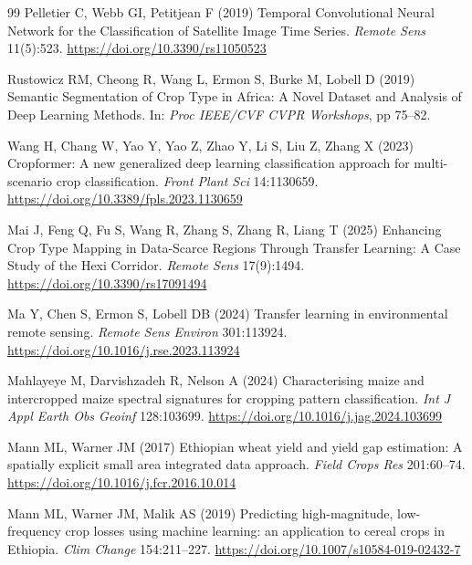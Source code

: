\documentclass[pdflatex,sn-mathphys]{sn-jnl} %
\begin{document}
\begin{thebibliography}{99}
Pelletier C, Webb GI, Petitjean F (2019) Temporal Convolutional Neural Network for the Classification of Satellite Image Time Series. \textit{Remote Sens} 11(5):523. \href{https://doi.org/10.3390/rs11050523}{https://doi.org/10.3390/rs11050523}

Rustowicz RM, Cheong R, Wang L, Ermon S, Burke M, Lobell D (2019) Semantic Segmentation of Crop Type in Africa: A Novel Dataset and Analysis of Deep Learning Methods. In: \textit{Proc IEEE/CVF CVPR Workshops}, pp 75--82.


Wang H, Chang W, Yao Y, Yao Z, Zhao Y, Li S, Liu Z, Zhang X (2023) Cropformer: A new generalized deep learning classification approach for multi-scenario crop classification. \textit{Front Plant Sci} 14:1130659. \href{https://doi.org/10.3389/fpls.2023.1130659}{https://doi.org/10.3389/fpls.2023.1130659}


Mai J, Feng Q, Fu S, Wang R, Zhang S, Zhang R, Liang T (2025) Enhancing Crop Type Mapping in Data-Scarce Regions Through Transfer Learning: A Case Study of the Hexi Corridor. \textit{Remote Sens} 17(9):1494. \href{https://doi.org/10.3390/rs17091494}{https://doi.org/10.3390/rs17091494}


Ma Y, Chen S, Ermon S, Lobell DB (2024) Transfer learning in environmental remote sensing. \textit{Remote Sens Environ} 301:113924. \href{https://doi.org/10.1016/j.rse.2023.113924}{https://doi.org/10.1016/j.rse.2023.113924}


Mahlayeye M, Darvishzadeh R, Nelson A (2024) Characterising maize and intercropped maize spectral signatures for cropping pattern classification. \textit{Int J Appl Earth Obs Geoinf} 128:103699. \href{https://doi.org/10.1016/j.jag.2024.103699}{https://doi.org/10.1016/j.jag.2024.103699}


Mann ML, Warner JM (2017) Ethiopian wheat yield and yield gap estimation: A spatially explicit small area integrated data approach. \textit{Field Crops Res} 201:60--74. \href{https://doi.org/10.1016/j.fcr.2016.10.014}{https://doi.org/10.1016/j.fcr.2016.10.014}

Mann ML, Warner JM, Malik AS (2019) Predicting high-magnitude, low-frequency crop losses using machine learning: an application to cereal crops in Ethiopia. \textit{Clim Change} 154:211--227. \href{https://doi.org/10.1007/s10584-019-02432-7}{https://doi.org/10.1007/s10584-019-02432-7}


\end{thebibliography}
\end{document}
